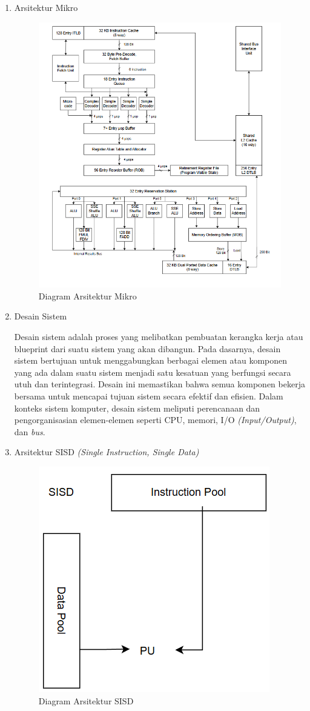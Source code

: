 \documentclass[12pt]{article}
\begin{document}
\begin{enumerate}
    

    
    \item Arsitektur Mikro

        \noindent
        \begin{figure}[H]
            \centering
            \includegraphics[width=0.4\linewidth]{asset/image4.png}
            \caption{Diagram Arsitektur Mikro}
            \label{fig:Diagram-Arsitektur-Mikro}
        \end{figure}
    

    \item Desain Sistem

      Desain sistem adalah proses yang melibatkan pembuatan kerangka kerja atau blueprint dari suatu sistem yang akan dibangun. Pada dasarnya, desain sistem bertujuan untuk menggabungkan berbagai elemen atau komponen yang ada dalam suatu sistem menjadi satu kesatuan yang berfungsi secara utuh dan terintegrasi. Desain ini memastikan bahwa semua komponen bekerja bersama untuk mencapai tujuan sistem secara efektif dan efisien. Dalam konteks sistem komputer, desain sistem meliputi perencanaan dan pengorganisasian elemen-elemen seperti CPU, memori, I/O \textit{(Input/Output)}, dan \textit{bus}.

      \item Arsitektur SISD \textit{(Single Instruction, Single Data)}


        \noindent
        \begin{figure}[H]
            \centering
            \includegraphics[width=0.4\linewidth]{asset/image6.png}
            \caption{Diagram Arsitektur SISD}
            \label{fig:Diagram-Arsitektur-SISD}
        \end{figure}
        

\end{enumerate}
\end{document}
